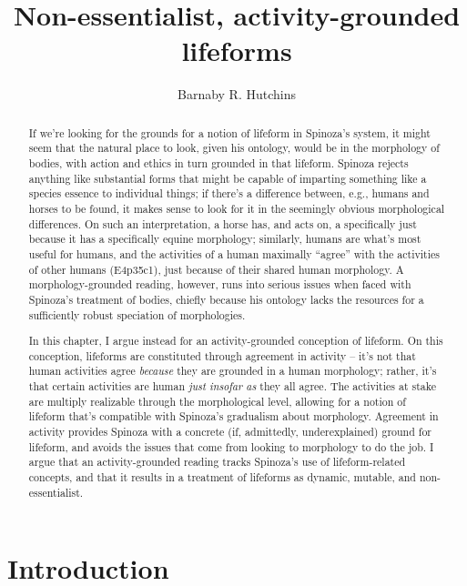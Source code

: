 \documentclass{article}
\title{Non-essentialist, activity-grounded lifeforms}
\author{Barnaby R. Hutchins}
\begin{document}
\maketitle

\begin{abstract}
If we're looking for the grounds for a notion of lifeform in Spinoza's system, it might seem that the natural place to look, given his ontology, would be in the morphology of bodies, with action and ethics in turn grounded in that lifeform. Spinoza rejects anything like substantial forms that might be capable of imparting something like a species essence to individual things; if there's a difference between, e.g., humans and horses to be found, it makes sense to look for it in the seemingly obvious morphological differences. On such an interpretation, a horse has, and acts on, a specifically  just because it has a specifically equine morphology; similarly, humans are what's most useful for humans, and the activities of a human maximally \enquote{agree}  with the activities of other humans (E4p35c1), just because of their shared human morphology. A morphology-grounded reading, however, runs into serious issues when faced with Spinoza's treatment of bodies, chiefly because his ontology lacks the resources for a sufficiently robust speciation of morphologies.

In this chapter, I argue instead for an activity-grounded conception of lifeform. On this conception, lifeforms are constituted through agreement in activity – it's not that human activities agree \emph{because} they are grounded in a human morphology; rather, it's that certain activities are human \emph{just insofar as} they all agree. The activities at stake are multiply realizable through the morphological level, allowing for a notion of lifeform that's compatible with Spinoza's gradualism about morphology. Agreement in activity provides Spinoza with a concrete (if, admittedly, underexplained) ground for lifeform, and avoids the issues that come from looking to morphology to do the job. I argue that an activity-grounded reading tracks Spinoza's use of lifeform-related concepts, and that it results in a treatment of lifeforms as dynamic, mutable, and non-essentialist.
\end{abstract}

\section{Introduction}
\end{document}
